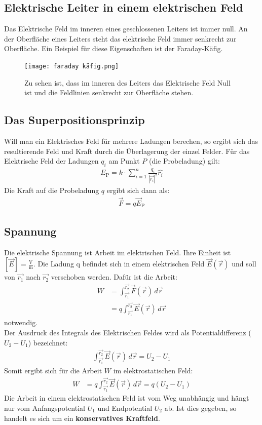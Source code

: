 \documentclass{scrartcl}
\begin{document}
\subsection{Elektrische Leiter in einem elektrischen Feld}
Das Elektrische Feld im inneren eines geschlossenen Leiters ist immer null.
An der Oberfläche eines Leiters steht das elektrische Feld immer senkrecht zur Oberfläche.
Ein Beispiel für diese Eigenschaften ist der Faraday-Käfig.
\begin{figure}[H]
    \centering 
    \texttt{[image: faraday käfig.png]}
    \caption{Zu sehen ist, dass im inneren des Leiters das Elektrische Feld Null ist und die Feldlinien senkrecht zur Oberfläche stehen.}
\end{figure}

\subsection{Das Superpositionsprinzip}
Will man ein Elektrisches Feld für mehrere Ladungen berechen, so ergibt sich das resultierende Feld und Kraft 
durch die Überlagerung der einzel Felder.
Für das Elektrische Feld der Ladungen $q_i$ am Punkt $P$ (die Probeladung) gilt:
\begin{align}
    E_\mathrm{P}=k\cdot \sum_{i=1}^n \frac{q_i}{|\vec{r_i}|^2}\hat{r_i}
\end{align}
Die Kraft auf die Probeladung $q$ ergibt sich dann als:
\begin{align}
    \vec{F}=q\vec{E}_\mathrm{P}
\end{align}


\subsection{Spannung}
Die elektrische Spannung ist Arbeit im elektrischen Feld. Ihre Einheit ist $[\vec{E}]=\frac{\mathrm{V}}{\mathrm{m}}$.
Die Ladung q befindet sich in einem elektrischen Feld $\vec{E}(\vec{r})$ und soll von $\vec{r_1}$ nach $\vec{r_2}$ verschoben
werden. Dafür ist die Arbeit:
\begin{align}
    W&=\int_{\vec{r_1}}^{\vec{r_2}}\vec{F}(\vec{r})\,d\vec{r}\\
    &=q\int_{\vec{r_1}}^{\vec{r_2}}\vec{E}(\vec{r})\,d\vec{r}
\end{align}
notwendig.\\

\noindent Der Ausdruck des Integrals des Elektrischen Feldes wird als Potentialdifferenz ($U_2-U_1$) bezeichnet:
\begin{align}
    \int_{\vec{r_1}}^{\vec{r_2}}\vec{E}(\vec{r})\,d\vec{r}=U_2-U_1
\end{align}
Somit ergibt sich für die Arbeit $W$ im elektrostatischen Feld:
\begin{align}
    W&=q\int_{\vec{r_1}}^{\vec{r_2}}\vec{E}(\vec{r})\,d\vec{r}=q(U_2-U_1)
\end{align}
Die Arbeit in einem elektrostatischen Feld ist vom Weg unabhängig und hängt
nur vom Anfangspotential \( U_1 \) und Endpotential \( U_2 \) ab.
Ist dies gegeben, so handelt es sich um ein \textbf{konservatives Kraftfeld}.\\
\end{document}
